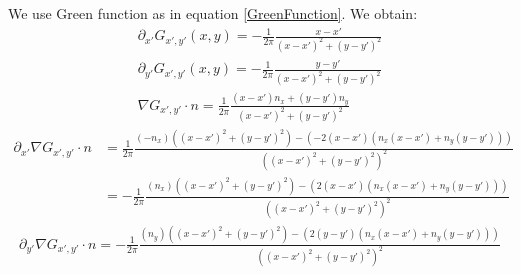 \documentclass[a4paper,12pt]{article}
\begin{document}
We use Green function as in equation \ref{GreenFunction}. We obtain:
\begin{align}
 \partial_{x'} G_{x',y'}(x,y)=-\frac{1}{2\pi}\frac{x-x'}{(x-x')^2+(y-y')^2}\\ \label{partialxaG}
\partial_{y'} G_{x',y'}(x,y)=-\frac{1}{2\pi}\frac{y-y'}{(x-x')^2+(y-y')^2} \\ \label{partialyaG}
\nabla G_{x',y'} \cdot n= \frac{1}{2\pi} \frac{(x-x')n_x+(y-y')n_y}{(x-x')^2+(y-y')^2}
\end{align}
\begin{align}
 \partial_{x'}\nabla G_{x',y'} \cdot n &=\frac{1}{2\pi} \frac{(-n_x)((x-x')^2+(y-y')^2)-(-2(x-x')(n_x(x-x')+n_y(y-y')))}{((x-x')^2+(y-y')^2)^2}\\
&= -\frac{1}{2\pi}  \frac{(n_x)((x-x')^2+(y-y')^2)-(2(x-x')(n_x(x-x')+n_y(y-y')))}{((x-x')^2+(y-y')^2)^2} \label{partialxaNablaGn}
\end{align}
\begin{align}
 \partial_{y'}\nabla G_{x',y'} \cdot n =-\frac{1}{2\pi}  \frac{(n_y)((x-x')^2+(y-y')^2)-(2(y-y')(n_x(x-x')+n_y(y-y')))}{((x-x')^2+(y-y')^2)^2}\label{partialyaNablaGn}
\end{align}
\end{document}
